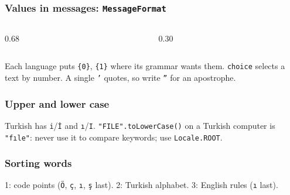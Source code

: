 \documentclass[aspectratio=169,10pt,compress]{beamer}
\begin{document}
\begin{frame}[t,fragile] \frametitle{Values in messages: \texttt{MessageFormat}}
  \begin{columns}[T]
    \begin{column}{0.68\textwidth}
    \end{column}
    \begin{column}{0.30\textwidth}
    \end{column}
  \end{columns}

  \vspace{0.1em}
  \small Each language puts \texttt{\{0\}}, \texttt{\{1\}} where its grammar wants them.
  \texttt{choice} selects a text by number. A single \texttt{'} quotes, so write \texttt{''} for an apostrophe.
\end{frame}





\begin{frame}[t,fragile] \frametitle{Upper and lower case}

  \vspace{0.1em}
  \small Turkish has \texttt{i}/\texttt{İ} and \texttt{ı}/\texttt{I}. \texttt{"FILE".toLowerCase()}
  on a Turkish computer is \texttt{"fıle"}: never use it to compare keywords; use \texttt{Locale.ROOT}.
\end{frame}




\begin{frame}[t,fragile] \frametitle{Sorting words}

  \vspace{0.1em}
  \small 1: code points (\texttt{Ö}, \texttt{ç}, \texttt{ı}, \texttt{ş} last). 2: Turkish alphabet. 3: English rules (\texttt{ı} last).
\end{frame}
\end{document}

